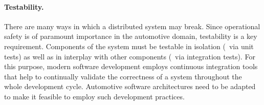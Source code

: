 \paragraph{Testability.}
There are many ways in which a distributed system may break. Since operational safety is of paramount importance in the automotive domain, testability is a key requirement. Components of the system must be testable in isolation (\eg\ via unit tests) as well as in interplay with other components (\eg\ via integration tests). For this purpose, modern software development employs continuous integration tools that help to continually validate the correctness of a system throughout the whole development cycle. Automotive software architectures need to be adapted to make it feasible to employ such development practices.


%
%
%
%
%
%
%
%
%
%